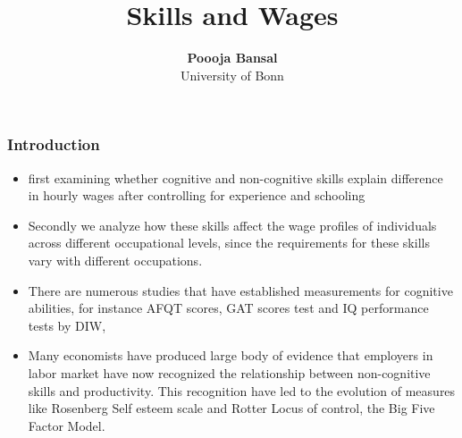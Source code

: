 \documentclass[11pt]{beamer}
\begin{document}
\title{Skills and Wages}

\author[Poooja Bansal]
{
{\bf Poooja Bansal}\\
{\small University of Bonn}\\[1ex]
}


\begin{frame}
    \titlepage
    \note{~}
\end{frame}


\begin{frame}[t]
    \frametitle{Introduction}
    \begin{itemize}
     Many empirical studies have recognized the importance of
non-cognitive skills along with the cognitive skills and we build on this
by :

\item first examining whether cognitive and non-cognitive skills explain
difference in hourly wages after controlling for experience and
schooling

\item Secondly we analyze how these skills affect the wage profiles of
individuals across different occupational levels, since the
requirements for these skills vary with different occupations.
     \end{itemize}
    \note{~}
\end{frame}

\begin{frame}[t]
  \begin{itemize}
People typically embody both type of skills: Cognitive skills driving their reasoning
and thinking; and non-cognitive skills incorporating their personality traits.

\item There are numerous studies that have established measurements for cognitive
abilities, for instance AFQT scores, GAT scores test and IQ performance tests by
DIW,

\item Many economists have produced large body of evidence that employers in labor
market have now recognized the relationship between non-cognitive skills and
productivity. This recognition have led to the evolution of measures like
Rosenberg Self esteem scale and Rotter Locus of control, the Big Five Factor
Model.
 \end{itemize}
\end{frame}
\end{document}
